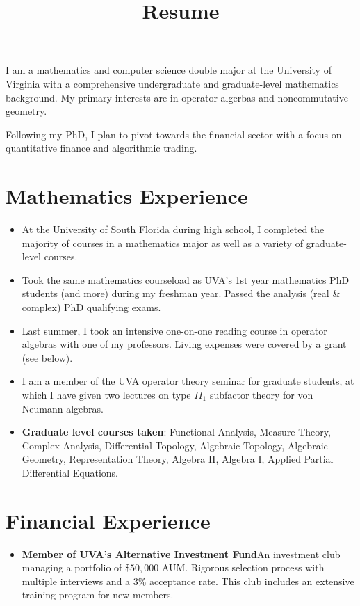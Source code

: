 \documentclass[12pt,letterpaper,sans]{moderncv}
\title{Resume}
\begin{document}
\makecvtitle %
\vspace*{-1.5em}


\begin{center}
  I am a mathematics and computer science double major at the University of Virginia with a comprehensive undergraduate and graduate-level mathematics background. My primary interests are in operator algerbas and noncommutative geometry.

\vspace{1.0em}
  Following my PhD, I plan to pivot towards the financial sector with a focus on quantitative finance and algorithmic trading.
\end{center}

\section{Mathematics Experience}

\begin{itemize}
  \item At the University of South Florida during high school, I completed the majority of courses in a mathematics major as well as a variety of graduate-level courses.
  \item Took the same mathematics courseload as UVA's 1st year mathematics PhD students (and more) during my freshman year. Passed the analysis (real \& complex) PhD qualifying exams.
  \item Last summer, I took an intensive one-on-one reading course in operator algebras with one of my professors. Living expenses were covered by a grant (see below).  
  \item I am a member of the UVA operator theory seminar for graduate students, at which I have given two lectures on type $ II_1 $ subfactor theory for von Neumann algebras.
  \item \textbf{Graduate level courses taken}: Functional Analysis, Measure Theory, Complex Analysis, Differential Topology, Algebraic Topology, Algebraic Geometry, Representation Theory, Algebra II, Algebra I, Applied Partial Differential Equations.
\end{itemize}

\section{Financial Experience}
\begin{itemize}
  \item \textbf{Member of UVA's Alternative Investment Fund}\quad An investment club managing a portfolio of $ \$50,000 $ AUM. Rigorous selection process with multiple interviews and a $ 3\% $ acceptance rate. This club includes an extensive training program for new members. 
\end{itemize}
\end{document}
